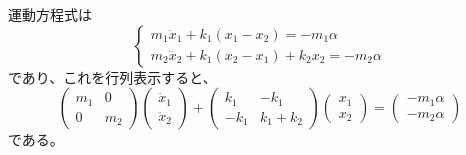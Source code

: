 \documentclass[a4paper]{jsarticle}
\begin{document}
\subsubsection{}
運動方程式は
\begin{equation}
  \begin{cases}
    m_1 \ddot{x}_1 + k_1 (x_1 - x_2) = -m_1 \alpha \\
    m_2 \ddot{x}_2 + k_1 (x_2 - x_1) + k_2 x_2 = -m_2 \alpha
  \end{cases}
\end{equation}
であり、これを行列表示すると、
\begin{equation}
  \begin{pmatrix}
    m_1 & 0 \\
    0 & m_2
  \end{pmatrix}
  \begin{pmatrix}
    \ddot{x}_1 \\
    \ddot{x}_2
  \end{pmatrix} +
  \begin{pmatrix}
    k_1 & -k_1 \\
    -k_1 & k_1 + k_2
  \end{pmatrix}
  \begin{pmatrix}
    x_1 \\
    x_2
  \end{pmatrix} =
  \begin{pmatrix}
    -m_1 \alpha \\
    -m_2 \alpha
  \end{pmatrix}
\end{equation}
である。
\end{document}
